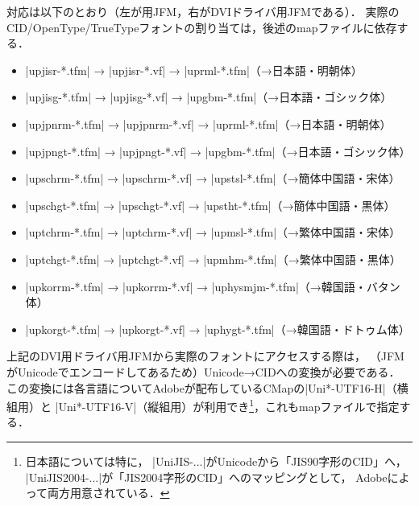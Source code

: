 \documentclass[a4paper,11pt,nomag]{jsarticle}
\begin{document}
対応は以下のとおり（左が\upTeX 用JFM，右がDVIドライバ用JFMである）．
実際のCID/OpenType/TrueTypeフォントの割り当ては，後述のmapファイルに依存する．
\begin{itemize}
  \item |upjisr-*.tfm| → |upjisr-*.vf| → |uprml-*.tfm|（→日本語・明朝体）
  \item |upjisg-*.tfm| → |upjisg-*.vf| → |upgbm-*.tfm|（→日本語・ゴシック体）
  \item |upjpnrm-*.tfm| → |upjpnrm-*.vf| → |uprml-*.tfm|（→日本語・明朝体）
  \item |upjpngt-*.tfm| → |upjpngt-*.vf| → |upgbm-*.tfm|（→日本語・ゴシック体）
  \item |upschrm-*.tfm| → |upschrm-*.vf| → |upstsl-*.tfm|（→簡体中国語・宋体）
  \item |upschgt-*.tfm| → |upschgt-*.vf| → |upstht-*.tfm|（→簡体中国語・黒体）
  \item |uptchrm-*.tfm| → |uptchrm-*.vf| → |upmsl-*.tfm|（→繁体中国語・宋体）
  \item |uptchgt-*.tfm| → |uptchgt-*.vf| → |upmhm-*.tfm|（→繁体中国語・黒体）
  \item |upkorrm-*.tfm| → |upkorrm-*.vf| → |uphysmjm-*.tfm|（→韓国語・バタン体）
  \item |upkorgt-*.tfm| → |upkorgt-*.vf| → |uphygt-*.tfm|（→韓国語・ドトゥム体）
\end{itemize}

上記のDVI用ドライバ用JFMから実際のフォントにアクセスする際は，
（JFMがUnicodeでエンコードしてあるため）Unicode→CIDへの変換が必要である．
この変換には各言語についてAdobeが配布しているCMapの|Uni*-UTF16-H|（横組用）と
|Uni*-UTF16-V|（縦組用）が利用でき\footnote{日本語については特に，
|UniJIS-...|がUnicodeから「JIS90字形のCID」へ，
|UniJIS2004-...|が「JIS2004字形のCID」へのマッピングとして，
Adobeによって両方用意されている．}，これもmapファイルで指定する．
\end{document}
